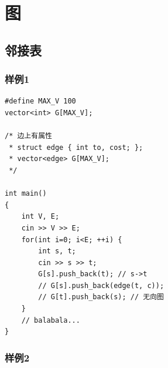 \documentclass[a4paper]{ctexrep}
\begin{document}
\chapter{图}
\section{邻接表}
\subsection{样例1}
\begin{lstlisting}
#define MAX_V 100
vector<int> G[MAX_V];

/* 边上有属性
 * struct edge { int to, cost; };
 * vector<edge> G[MAX_V];
 */

int main()
{
	int V, E;
	cin >> V >> E;
	for(int i=0; i<E; ++i) {
		int s, t;
		cin >> s >> t;
		G[s].push_back(t); // s->t
		// G[s].push_back(edge(t, c));
		// G[t].push_back(s); // 无向图
	}
	// balabala...
}
\end{lstlisting}


\subsection{样例2}
\end{document}
